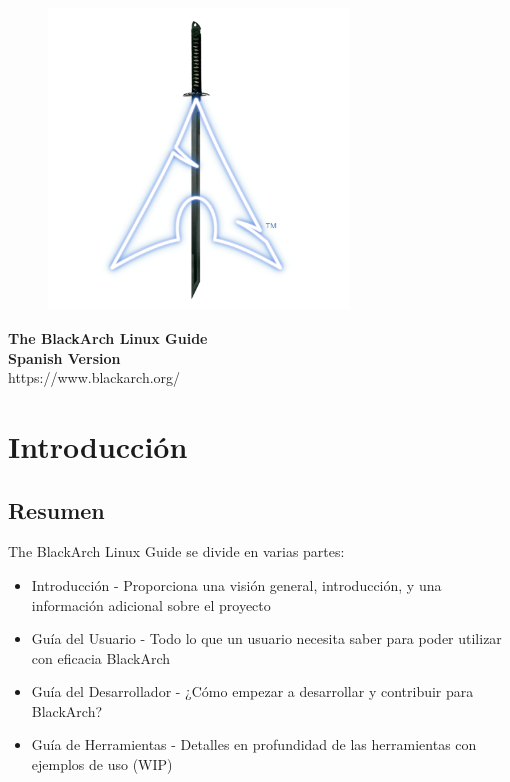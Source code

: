 \documentclass[a4paper, oneside, 11pt]{book}
\begin{document}
\pagestyle{empty}
\begin{center}
\begin{figure}[htbp]
\centering
\vspace{0.5cm}
\includegraphics[width=8cm]{images/logo.png}
\label{fig:logo}
\end{figure}
\vspace{0.5cm}
\Huge{\textbf{The BlackArch Linux Guide}}\\
\vspace{0.5cm}
\Large{\textbf{Spanish Version}}\\
\vspace{1cm}
\Large{\color{red}https://www.blackarch.org/}\\
\vspace{0.5cm}
\end{center}
\newpage
\tableofcontents
\newpage
\pagestyle{fancy}


\chapter{Introducci\'on}

\section{Resumen}
The BlackArch Linux Guide se divide en varias partes:
\begin{itemize}
\item Introducci\'on - Proporciona una visi\'on general, introducci\'on, y una informaci\'on adicional sobre el proyecto
\item Gu\'ia del Usuario - Todo lo que un usuario necesita saber para poder utilizar con eficacia BlackArch
\item Gu\'ia del Desarrollador - ¿C\'omo empezar a desarrollar y contribuir para BlackArch?
\item Gu\'ia de Herramientas - Detalles en profundidad de las herramientas con ejemplos de uso (WIP)
\end{itemize}
\end{document}
